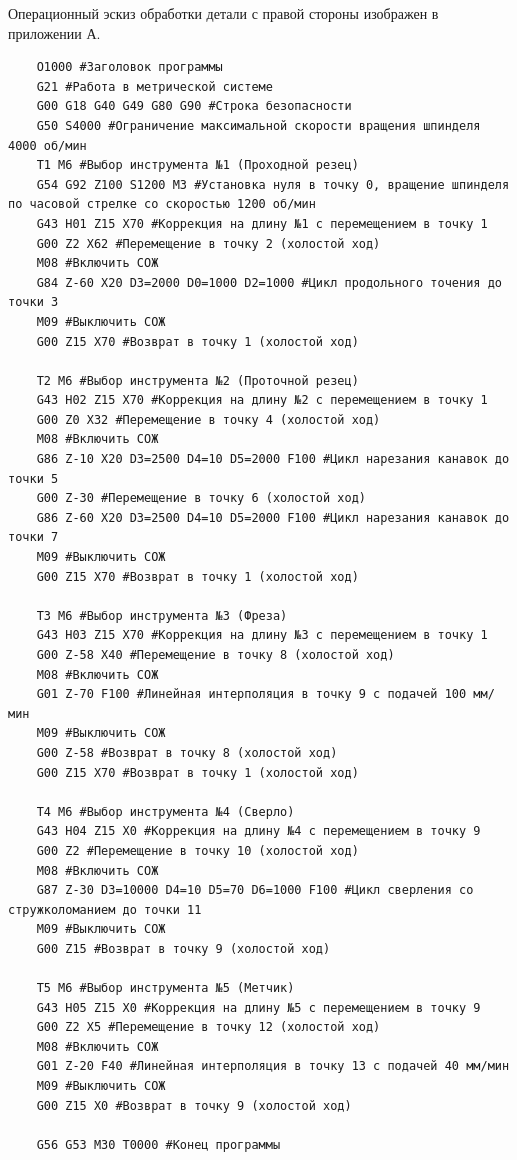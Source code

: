 Операционный эскиз обработки детали с правой стороны изображен в приложении А.

\begin{verbatim}
    O1000 #Заголовок программы
    G21 #Работа в метрической системе
    G00 G18 G40 G49 G80 G90 #Строка безопасности
    G50 S4000 #Ограничение максимальной скорости вращения шпинделя 4000 об/мин
    T1 M6 #Выбор инструмента №1 (Проходной резец)
    G54 G92 Z100 S1200 M3 #Установка нуля в точку 0, вращение шпинделя по часовой стрелке со скоростью 1200 об/мин
    G43 H01 Z15 X70 #Коррекция на длину №1 с перемещением в точку 1
    G00 Z2 X62 #Перемещение в точку 2 (холостой ход)
    M08 #Включить СОЖ
    G84 Z-60 X20 D3=2000 D0=1000 D2=1000 #Цикл продольного точения до точки 3
    M09 #Выключить СОЖ
    G00 Z15 X70 #Возврат в точку 1 (холостой ход)

    T2 M6 #Выбор инструмента №2 (Проточной резец)
    G43 H02 Z15 X70 #Коррекция на длину №2 с перемещением в точку 1
    G00 Z0 X32 #Перемещение в точку 4 (холостой ход)
    M08 #Включить СОЖ
    G86 Z-10 X20 D3=2500 D4=10 D5=2000 F100 #Цикл нарезания канавок до точки 5
    G00 Z-30 #Перемещение в точку 6 (холостой ход)
    G86 Z-60 X20 D3=2500 D4=10 D5=2000 F100 #Цикл нарезания канавок до точки 7
    M09 #Выключить СОЖ
    G00 Z15 X70 #Возврат в точку 1 (холостой ход)

    T3 M6 #Выбор инструмента №3 (Фреза)
    G43 H03 Z15 X70 #Коррекция на длину №3 с перемещением в точку 1
    G00 Z-58 X40 #Перемещение в точку 8 (холостой ход)
    M08 #Включить СОЖ
    G01 Z-70 F100 #Линейная интерполяция в точку 9 с подачей 100 мм/мин
    M09 #Выключить СОЖ
    G00 Z-58 #Возврат в точку 8 (холостой ход)
    G00 Z15 X70 #Возврат в точку 1 (холостой ход)

    T4 M6 #Выбор инструмента №4 (Сверло)
    G43 H04 Z15 X0 #Коррекция на длину №4 с перемещением в точку 9
    G00 Z2 #Перемещение в точку 10 (холостой ход)
    M08 #Включить СОЖ
    G87 Z-30 D3=10000 D4=10 D5=70 D6=1000 F100 #Цикл сверления со стружколоманием до точки 11
    M09 #Выключить СОЖ
    G00 Z15 #Возврат в точку 9 (холостой ход)

    T5 M6 #Выбор инструмента №5 (Метчик)
    G43 H05 Z15 X0 #Коррекция на длину №5 с перемещением в точку 9
    G00 Z2 X5 #Перемещение в точку 12 (холостой ход)
    M08 #Включить СОЖ
    G01 Z-20 F40 #Линейная интерполяция в точку 13 с подачей 40 мм/мин
    M09 #Выключить СОЖ
    G00 Z15 X0 #Возврат в точку 9 (холостой ход)

    G56 G53 M30 T0000 #Конец программы
\end{verbatim}

